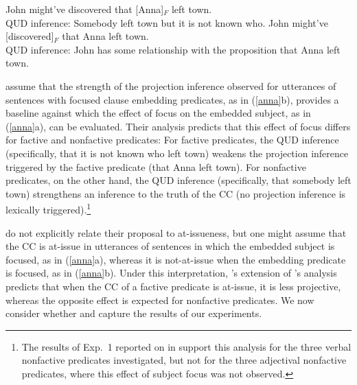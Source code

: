 \documentclass[11pt,fleqn]{article}
\newcommand{\6}{\mbox{$[\hspace*{-.6mm}[$}}
\newcommand{\9}{\mbox{$]\hspace*{-.6mm}]$}}
\newcommand{\citepos}[1]{\citeauthor{#1}'s \citeyear{#1}}
\begin{document}
\begin{exe}
\ex\label{anna} \citealt[73]{djaerv-bacovcin2020}
\begin{xlist}
\ex John might've discovered that [Anna]$_F$ left town. \\ QUD inference: Somebody left town but it is not known who.
\ex John might've [discovered]$_F$ that Anna left town.  \\ QUD inference: John has some relationship with the proposition that Anna left town.
\end{xlist}
\end{exe}
\citealt{djaerv-bacovcin2020} assume that the strength of the projection inference observed for utterances of sentences with focused clause embedding predicates, as in (\ref{anna}b), provides a baseline against which the effect of focus on the embedded subject, as in (\ref{anna}a), can be evaluated. Their analysis predicts that this effect of focus differs for factive and nonfactive predicates: For factive predicates, the QUD inference (specifically, that it is not known who left town) weakens the projection inference triggered by the factive predicate (that Anna left town). For nonfactive predicates, on the other hand, the QUD inference (specifically, that somebody left town) strengthens an inference to the truth of the CC (no projection inference is lexically triggered).\footnote{The results of Exp.~1 reported on in \citealt{djaerv-bacovcin2020} support this analysis for the three verbal nonfactive predicates investigated, but not for the three adjectival nonfactive predicates, where this effect of subject focus was not observed.}

\citealt{djaerv-bacovcin2020} do not explicitly relate their proposal to at-issueness, but one might assume that the CC is at-issue in utterances of sentences in which the embedded subject is focused, as in (\ref{anna}a), whereas it is not-at-issue when the embedding predicate is focused, as in (\ref{anna}b). Under this interpretation,  \citepos{djaerv-bacovcin2020} extension of \citepos{heim83} analysis predicts that when the CC of a factive predicate is at-issue, it is less projective, whereas the opposite effect is expected for nonfactive predicates. We now consider whether \citealt{heim83} and \citealt{djaerv-bacovcin2020} capture the results of our experiments. 
\end{document}
